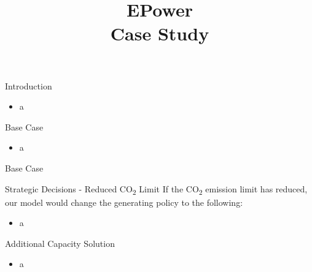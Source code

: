 \documentclass{beamer}
\title[EPower Case Study]{\Huge EPower\\[0.2cm]\large Case Study}
\institute{University of Edinburgh}
\date{}
\begin{document}
	
    
    \begin{frame}
    	\titlepage
    \end{frame}


    
    \begin{frame}{Introduction}

        \begin{itemize}
           \item a
        \end{itemize}
        
    \end{frame}
    
    \begin{frame}{Base Case}
    	\begin{itemize}
    	\item a
    	\end{itemize}
    
    \end{frame}
    
    \begin{frame}{Base Case}
    
        \begin{figure}[H]
            \centering
        \end{figure}
    
    \end{frame}
    

    
    
    
    \begin{frame}{Strategic Decisions - Reduced CO\textsubscript{2} Limit}
    	If the CO\textsubscript{2} emission limit has reduced, our model would change the generating policy to the following:
        
        \begin{itemize}
    	\item a
    	\end{itemize}
    \end{frame}
    
    \begin{frame}{Additional Capacity Solution}
    
    	\begin{itemize}
    	\item a
    	\end{itemize}
    \end{frame}
    
\end{document}
